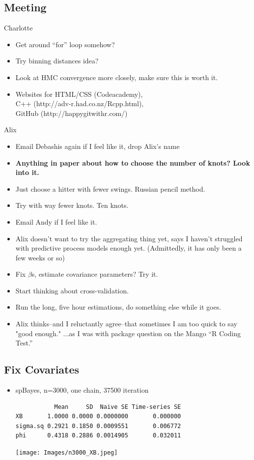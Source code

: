 \documentclass{article}
\begin{document}
\subsection*{Meeting}
Charlotte
\begin{itemize}
\item Get around ``for'' loop somehow?
\item Try binning distances idea?
\item Look at HMC convergence more closely, make sure this is worth it.
\item Websites for HTML/CSS (Codeacademy), \\ C++ (http://adv-r.had.co.nz/Rcpp.html), \\ GitHub (http://happygitwithr.com/)
\end{itemize}
Alix
\begin{itemize}
\item Email Debashis again if I feel like it, drop Alix's name
\item {\bf Anything in paper about how to choose the number of knots? Look into it.}
\item Just choose a hitter with fewer swings. Russian pencil method.
\item Try with way fewer knots. Ten knots.
\item Email Andy if I feel like it.
\item Alix doesn't want to try the aggregating thing yet, says I haven't struggled with predictive process models enough yet. (Admittedly, it has only been a few weeks or so)
\item Fix $\beta$s, estimate covariance parameters? Try it.
\item Start thinking about cross-validation.
\item Run the long, five hour estimations, do something else while it goes.
\item Alix thinks--and I reluctantly agree--that sometimes I am too quick to say "good enough." ...as I was with package question on the Mango ``R Coding Test.''
\end{itemize}

\subsection*{Fix Covariates}
\begin{itemize}
\item spBayes, n=3000, one chain, 37500 iteration
\begin{verbatim}
           Mean     SD  Naive SE Time-series SE
XB       1.0000 0.0000 0.0000000       0.000000
sigma.sq 0.2921 0.1850 0.0009551       0.006772
phi      0.4318 0.2886 0.0014905       0.032011
\end{verbatim}
\texttt{[image: Images/n3000\_XB.jpeg]} \\

\end{itemize}
\end{document}
